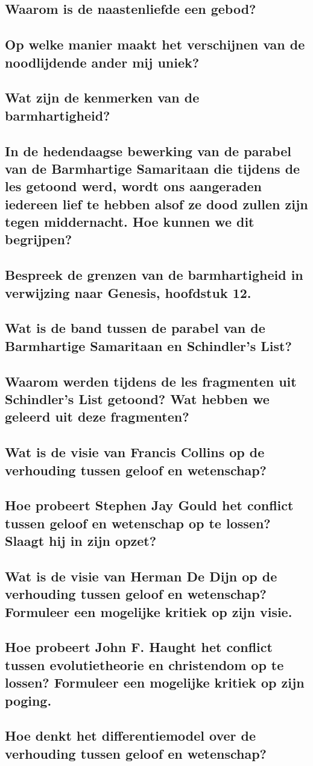 \documentclass[main.tex]{subfiles}
\begin{document}
\subsection{Waarom is de naastenliefde een gebod?}
\subsection{Op welke manier maakt het verschijnen van de noodlijdende ander mij uniek?}
\subsection{Wat zijn de kenmerken van de barmhartigheid?}
\subsection{In de hedendaagse bewerking van de parabel van de Barmhartige Samaritaan die tijdens de les getoond werd, wordt ons aangeraden iedereen lief te hebben alsof ze dood zullen zijn tegen middernacht. Hoe kunnen we dit begrijpen?}
\subsection{Bespreek de grenzen van de barmhartigheid in verwijzing naar Genesis, hoofdstuk 12.}
\subsection{Wat is de band tussen de parabel van de Barmhartige Samaritaan en Schindler’s List?}
\subsection{Waarom werden tijdens de les fragmenten uit Schindler’s List getoond? Wat hebben we geleerd uit deze fragmenten?}
\subsection{Wat is de visie van Francis Collins op de verhouding tussen geloof en wetenschap?}
\subsection{Hoe probeert Stephen Jay Gould het conflict tussen geloof en wetenschap op te lossen? Slaagt hij in zijn opzet?}
\subsection{Wat is de visie van Herman De Dijn op de verhouding tussen geloof en wetenschap? Formuleer een mogelijke kritiek op zijn visie.}
\subsection{Hoe probeert John F. Haught het conflict tussen evolutietheorie en christendom op te lossen? Formuleer een mogelijke kritiek op zijn poging.}
\subsection{Hoe denkt het differentiemodel over de verhouding tussen geloof en wetenschap?}
\end{document}
